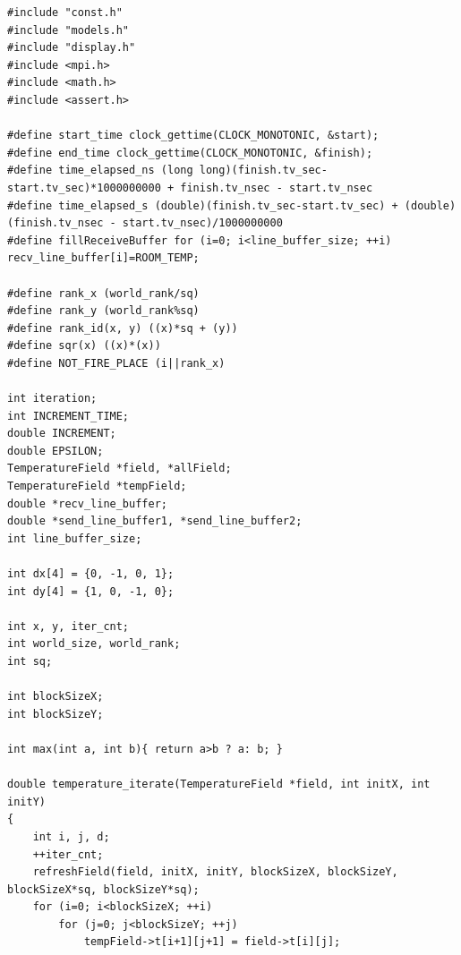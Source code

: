 \documentclass{acm_proc_article-sp}
\begin{document}
\begin{lstlisting}[caption=main\_mpi\_increment.h]
#include "const.h"
#include "models.h"
#include "display.h"
#include <mpi.h>
#include <math.h>
#include <assert.h>

#define start_time clock_gettime(CLOCK_MONOTONIC, &start);
#define end_time clock_gettime(CLOCK_MONOTONIC, &finish); 
#define time_elapsed_ns (long long)(finish.tv_sec-start.tv_sec)*1000000000 + finish.tv_nsec - start.tv_nsec
#define time_elapsed_s (double)(finish.tv_sec-start.tv_sec) + (double)(finish.tv_nsec - start.tv_nsec)/1000000000
#define fillReceiveBuffer for (i=0; i<line_buffer_size; ++i) recv_line_buffer[i]=ROOM_TEMP;

#define rank_x (world_rank/sq)
#define rank_y (world_rank%sq)
#define rank_id(x, y) ((x)*sq + (y))
#define sqr(x) ((x)*(x))
#define NOT_FIRE_PLACE (i||rank_x)

int iteration;
int INCREMENT_TIME;
double INCREMENT;
double EPSILON;
TemperatureField *field, *allField;
TemperatureField *tempField;
double *recv_line_buffer;
double *send_line_buffer1, *send_line_buffer2;
int line_buffer_size;

int dx[4] = {0, -1, 0, 1};
int dy[4] = {1, 0, -1, 0};

int x, y, iter_cnt;
int world_size, world_rank;
int sq;

int blockSizeX;
int blockSizeY;

int max(int a, int b){ return a>b ? a: b; }

double temperature_iterate(TemperatureField *field, int initX, int initY)
{
	int i, j, d;
	++iter_cnt;
	refreshField(field, initX, initY, blockSizeX, blockSizeY, blockSizeX*sq, blockSizeY*sq);
	for (i=0; i<blockSizeX; ++i)
		for (j=0; j<blockSizeY; ++j)
			tempField->t[i+1][j+1] = field->t[i][j];


\end{lstlisting}
\end{document}
